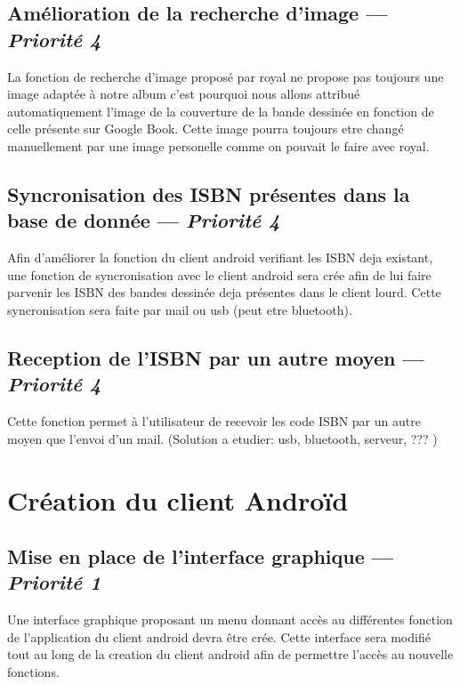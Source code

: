 \section[Amélioration de la recherche d'image]{Amélioration de la recherche d'image — \emph{Priorité 4}}
La fonction de recherche d'image proposé par royal ne propose pas toujours une image adaptée à notre album c'est pourquoi nous allons attribué automatiquement l'image de la couverture de la bande dessinée en fonction de celle présente sur Google Book. Cette image pourra toujours etre changé manuellement par une image personelle comme on pouvait le faire avec royal.

\section[Syncronisation des ISBN présentes dans la base de donnée]{Syncronisation des ISBN présentes dans la base de donnée — \emph{Priorité 4}}
Afin d'améliorer la fonction du client android verifiant les ISBN deja existant, une fonction de syncronisation avec le client android sera crée afin de lui faire parvenir les ISBN des bandes dessinée deja présentes dans le client lourd. Cette syncronisation sera faite par mail ou usb (peut etre bluetooth).

\section[Reception de l'ISBN par un autre moyen]{Reception de l'ISBN par un autre moyen — \emph{Priorité 4}}
Cette fonction permet à l'utilisateur de recevoir les code ISBN par un autre moyen que l'envoi d'un mail. (Solution a etudier: usb, bluetooth, serveur, ??? )

\chapter{Création du client Androïd}


\section[Mise en place de l'interface graphique]{Mise en place de l'interface graphique  — \emph{Priorité 1}}
Une interface graphique proposant un menu donnant accès au différentes fonction de l'application du client android devra être crée. Cette interface sera modifié tout au long de la creation du client android afin de permettre l'accès au nouvelle fonctions.

